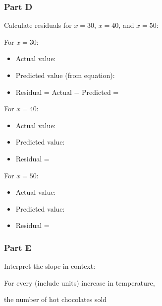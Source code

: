 \documentclass[12pt]{article}
\begin{document}
\begin{itemize}
			\subsubsection*{Part D}
			
				Calculate residuals for $x = 30$, $x = 40$, and $x = 50$:

				For $x = 30$:
				\begin{itemize}
					\item Actual value: \underline{\hspace{1in}}
					\item Predicted value (from equation): \underline{\hspace{1in}}
					\item Residual = Actual $-$ Predicted = \underline{\hspace{1in}}
				\end{itemize}

				For $x = 40$:
				\begin{itemize}
					\item Actual value: \underline{\hspace{1in}}
					\item Predicted value: \underline{\hspace{1in}}
					\item Residual = \underline{\hspace{1in}}
				\end{itemize}

				For $x = 50$:
				\begin{itemize}
					\item Actual value: \underline{\hspace{1in}}
					\item Predicted value: \underline{\hspace{1in}}
					\item Residual = \underline{\hspace{1in}}
				\end{itemize}

				\newpage

			\subsubsection*{Part E}
			
				Interpret the slope in context:

				For every \underline{\hspace{2in}} (include units) increase in temperature,

				the number of hot chocolates sold
				

\end{itemize}
\end{document}
